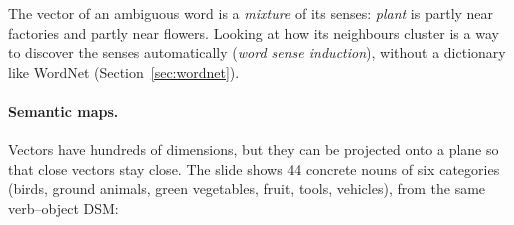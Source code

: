\begin{nbwhy}
The vector of an ambiguous word is a \emph{mixture} of its senses: \emph{plant} is
partly near factories and partly near flowers. Looking at how its neighbours cluster is
a way to discover the senses automatically (\emph{word sense induction}), without a
dictionary like WordNet (Section~\ref{sec:wordnet}).
\end{nbwhy}

\paragraph{Semantic maps.}
Vectors have hundreds of dimensions, but they can be projected onto a plane so that close
vectors stay close. The slide shows 44 concrete nouns of six categories (birds, ground
animals, green vegetables, fruit, tools, vehicles), from the same verb--object DSM:

